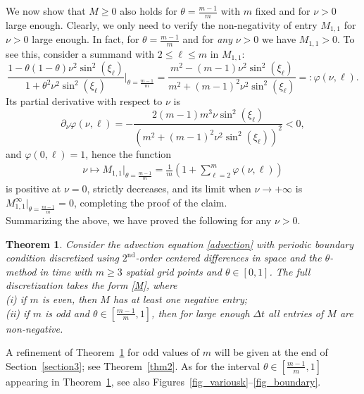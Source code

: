 \documentclass[a4paper]{article}
\newtheorem{theorem}{Theorem}
\newcommand{\dt}{\Delta t}
\newcommand{\te}{\theta}
\begin{document}
\begin{description}[style=unboxed,leftmargin=0cm]
We now show that $M\ge 0$ also holds for $\theta=\frac{m-1}{m}$ with $m$ fixed and for $\nu>0$ large enough. 
Clearly, we only need to verify the non-negativity of entry $M_{1,1}$ for $\nu>0$ large enough. 
In fact, for $\theta=\frac{m-1}{m}$ and for \emph{any} $\nu>0$ we have $M_{1,1}> 0$. To see this, consider a summand with $2\le\ell\le m$ in $M_{1,1}$: 
\[
 \frac{1-\theta(1-\theta)\nu^2\sin^2(\xi_\ell)}{1+\theta^2\nu^2\sin^2(\xi_\ell)}\Bigg|_{\theta=\frac{m-1}{m}}=
 \frac{m^2-(m-1) \nu ^2 \sin ^2\left(\xi _\ell\right)}{m^2+(m-1)^2 \nu ^2 \sin ^2\left(\xi _\ell\right)}=:\varphi(\nu,\ell).
\]
Its partial derivative with respect to $\nu$ is
\[
\partial_\nu\varphi(\nu,\ell)=-\frac{2 (m-1) m^3 \nu  \sin ^2\left(\xi _\ell\right)}{\left(m^2+(m-1)^2 \nu ^2 \sin ^2\left(\xi _\ell\right)\right)^2}<0,
\]
and $\varphi(0,\ell)=1$, hence the function
\begin{align*}
	\nu\mapsto M_{1,1}\Big|_{\theta=\frac{m-1}{m}} =
		\frac{1}{m} \left(1 + \sum_{\ell=2}^{m} \varphi(\nu,\ell)\right)
\end{align*}
is positive at $\nu=0$, strictly decreases, and its limit when $\nu\to +\infty$ is
$M_{1,1}^\infty\big|_{\theta=\frac{m-1}{m}}=0$, completing the proof of the claim.\\

Summarizing the above, we have proved the following for any $\nu>0$.
\end{description}
\begin{theorem}\label{thm1}
Consider the advection equation \eqref{advection} with periodic boundary condition discretized using
$2^{\text{nd}}$-order centered differences in space and the $\theta$-method in time with $m\ge 3$ spatial grid
points and $\te\in[0,1]$.
The full discretization takes the form \eqref{M},
where\\
(i) if $m$ is even, then $M$ has at least one negative entry;\\
(ii) if $m$ is odd and $\theta\in\left[\frac{m-1}{m},1\right]$, then for large enough $\dt$ all
entries of $M$ are non-negative.
\end{theorem}



A refinement of Theorem~\ref{thm1} for odd values of $m$ will be given at the end of
Section~\ref{section3}; see Theorem~\ref{thm2}.
As for the interval $\theta\in\left[\frac{m-1}{m},1\right]$ appearing in Theorem~\ref{thm1}, see also
Figures~\ref{fig_variousk}--\ref{fig_boundary}.
\end{document}
